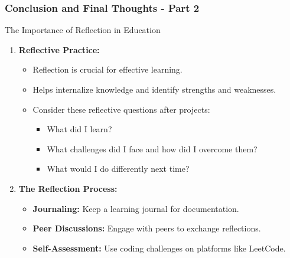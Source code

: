 \documentclass{beamer}
\begin{document}
\begin{frame}[fragile]
    \frametitle{Conclusion and Final Thoughts - Part 2}
    
    \begin{block}{The Importance of Reflection in Education}
        \begin{enumerate}
            \item \textbf{Reflective Practice:}
            \begin{itemize}
                \item Reflection is crucial for effective learning.
                \item Helps internalize knowledge and identify strengths and weaknesses.
                \item Consider these reflective questions after projects:
                \begin{itemize}
                    \item What did I learn?
                    \item What challenges did I face and how did I overcome them?
                    \item What would I do differently next time?
                \end{itemize}
            \end{itemize}
            
            \item \textbf{The Reflection Process:}
            \begin{itemize}
                \item \textbf{Journaling:} Keep a learning journal for documentation.
                \item \textbf{Peer Discussions:} Engage with peers to exchange reflections.
                \item \textbf{Self-Assessment:} Use coding challenges on platforms like LeetCode.
            \end{itemize}
        \end{enumerate}
    \end{block}
\end{frame}
\end{document}
